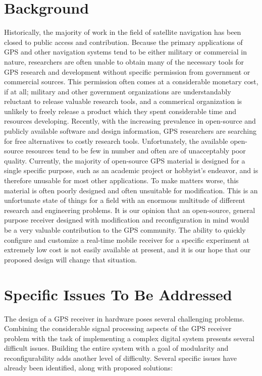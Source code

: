 \documentclass[14pt]{article}
\begin{document}
\section*{Background}
Historically, the majority of work in the field of satellite navigation has been closed to public
access and contribution.  Because the primary applications of GPS and other navigation systems tend to
be either military or commercial in nature, researchers are often unable to obtain many of the necessary
tools for GPS research and development without specific permission from government or commercial
sources.  This permission often comes at a considerable monetary cost, if at all; military and other
government organizations are understandably reluctant to release valuable research tools, and a
commerical organization is unlikely to freely release a product which they spent considerable time and
resources developing.  Recently, with the increasing prevalence in open-source and publicly available
software and design information, GPS researchers are searching for free alternatives to costly
research tools.  Unfortunately, the available open-source resources tend to be few in number and often
are of unacceptably poor quality.  Currently, the majority of open-source GPS material is designed for a
single specific purpose, such as an academic project or hobbyist's endeavor, and is therefore unusable
for most other applications.  To make matters worse, this material is often poorly designed and often
unsuitable for modification.  This is an unfortunate state of things for a field with an enormous
multitude of different research and engineering problems.  It is our opinion that an open-source, 
general purpose receiver designed with modification and reconfiguration in mind would be a very valuable
contribution to the GPS community.  The ability to quickly configure and customize a
real-time mobile receiver for a specific experiment at extremely low cost is not easily available at
present, and it is our hope that our proposed design will change that situation.

\section*{Specific Issues To Be Addressed}
The design of a GPS receiver in hardware poses several challenging problems.  Combining the considerable 
signal processing aspects of the GPS receiver problem with the task of implementing a complex digital
system presents several difficult issues.  Building the entire system with a goal of modularity and
reconfigurability adds another level of difficulty.  Several specific issues have already been
identified, along with proposed solutions:
\end{document}
